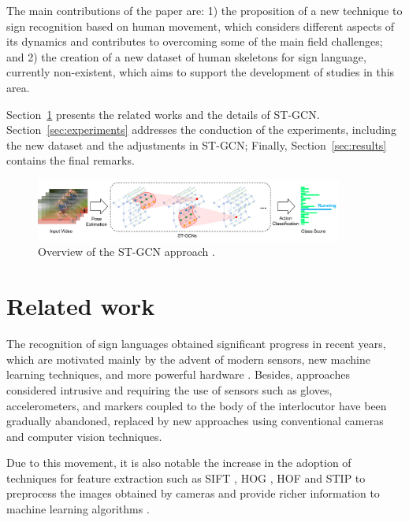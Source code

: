 The main contributions of the paper are: 1) the proposition of a new technique to sign recognition based on human movement, which considers different aspects of its dynamics and contributes to overcoming some of the main field challenges; and 2) the creation of a new dataset of human skeletons for sign language, currently non-existent, which aims to support the development of studies in this area.

Section~\ref{sec:related-work} presents the related works and the details of ST-GCN. Section~\ref{sec:experiments} addresses the conduction of the experiments, including the new dataset and the adjustments in ST-GCN; Finally, Section~\ref{sec:results} contains the final remarks.

\begin{figure}[!ht]
    \centering
    \includegraphics[width=0.9\textwidth]{images/st_gcn_workflow}
    \caption{Overview of the ST-GCN approach \cite[p. 3]{st-gcn-2018}.}
    \label{fig:st-gcn-workflow}
\end{figure}


\section{Related work}
\label{sec:related-work}

The recognition of sign languages obtained significant progress in recent years, which are motivated mainly by the advent of modern sensors, new machine learning techniques, and more powerful hardware \cite{recent-advances-dl-2017, recent-advances-sl-2013}. Besides, approaches considered intrusive and requiring the use of sensors such as gloves, accelerometers, and markers coupled to the body of the interlocutor have been gradually abandoned, replaced by new approaches using conventional cameras and computer vision techniques.

Due to this movement, it is also notable the increase in the adoption of techniques for feature extraction such as SIFT \cite{lowe-2004}, HOG \cite{dalal-2005}, HOF \cite{laptev-2008} and STIP \cite{laptev-2008} to preprocess the images obtained by cameras and provide richer information to machine learning algorithms \cite{lim-2016, shanta-2018}.

